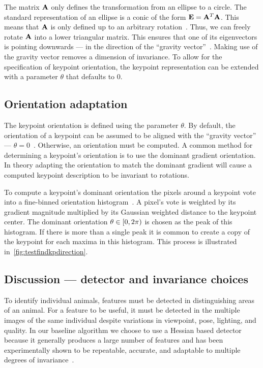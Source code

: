         The matrix $\mathbf{A}$ only defines the transformation from an ellipse to a circle. The standard representation
        of an ellipse is a conic of the form $\mathbf{E} = \mathbf{A}^T\mathbf{A}$. This means that $\mathbf{A}$ is only defined up
        to an arbitrary rotation~\cite{mikolajczyk_comparison_2005,perdoch_efficient_2009}. Thus, we can freely
        rotate $\mathbf{A}$ into a lower triangular matrix. This ensures that one of its eigenvectors is pointing
        downwards --- \ie{} in the direction of the ``gravity vector''~\cite{perdoch_efficient_2009}. Making use of
        the gravity vector removes a dimension of invariance. To allow for the specification of keypoint
        orientation, the keypoint representation can be extended with a parameter $\theta$ that defaults to $0$.

    \subsection{Orientation adaptation}

        The keypoint orientation is defined using the parameter $\theta$.
        By default, the orientation of a keypoint can be assumed to be aligned with the ``gravity vector'' ---
          \ie{} $\theta=0$~\cite{perdoch_efficient_2009}.
        Otherwise, an orientation must be computed.
        A common method for determining a keypoint's orientation is to use the dominant gradient orientation.
        In theory adapting the orientation to match the dominant gradient will cause a computed keypoint
          description to be invariant to rotations.

        To compute a keypoint's dominant orientation the pixels around a keypoint vote into a fine-binned
        orientation histogram~\cite{lowe_distinctive_2004}. A pixel's vote is weighted by its gradient magnitude
        multiplied by its Gaussian weighted distance to the keypoint center. The dominant orientation %
        $\theta \in [0,2\pi\rparen$ is chosen as the peak of this histogram. If there is more than a single peak
        it is common to create a copy of the keypoint for each maxima in this histogram. This process is
        illustrated in~\cref{fig:testfindkpdirection}.

        \testfindkpdirection{}

        \FloatBarrier{}

    \subsection{Discussion --- detector and invariance choices}
        To identify individual animals, features must be detected in distinguishing areas of an animal. For a
        feature to be useful, it must be detected in the multiple images of the same individual despite variations
        in viewpoint, pose, lighting, and quality. In our baseline algorithm we choose to use a Hessian based
        detector~\cite{perdoch_efficient_2009, lindeberg_feature_1998} because it generally produces a large number
        of features and has been experimentally shown to be repeatable, accurate, and adaptable to multiple degrees
        of invariance~\cite{tuytelaars_local_2007}.


